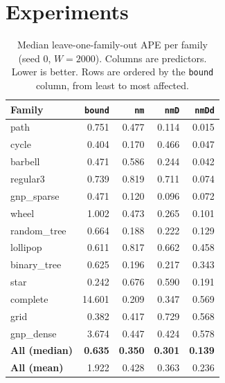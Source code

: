 \documentclass{article}
\begin{document}
\section{Experiments}
\begin{table}[t]
\caption{Median leave-one-family-out APE per family (seed 0, $W=2000$). Columns are predictors. Lower is better. Rows are ordered by the \texttt{bound} column, from least to most affected.}
\label{tab:fam}
\begin{center}
\small
\begin{tabular}{lrrrr}
\toprule
Family & \texttt{bound} & \texttt{nm} & \texttt{nmD} & \texttt{nmDd} \\
\midrule
path & 0.751 & 0.477 & 0.114 & 0.015 \\
cycle & 0.404 & 0.170 & 0.466 & 0.047 \\
barbell & 0.471 & 0.586 & 0.244 & 0.042 \\
regular3 & 0.739 & 0.819 & 0.711 & 0.074 \\
gnp\_sparse & 0.471 & 0.120 & 0.096 & 0.072 \\
wheel & 1.002 & 0.473 & 0.265 & 0.101 \\
random\_tree & 0.664 & 0.188 & 0.222 & 0.129 \\
lollipop & 0.611 & 0.817 & 0.662 & 0.458 \\
binary\_tree & 0.625 & 0.196 & 0.217 & 0.343 \\
star & 0.242 & 0.676 & 0.590 & 0.191 \\
complete & 14.601 & 0.209 & 0.347 & 0.569 \\
grid & 0.382 & 0.417 & 0.729 & 0.568 \\
gnp\_dense & 3.674 & 0.447 & 0.424 & 0.578 \\
\midrule
\textbf{All (median)} & \textbf{0.635} & \textbf{0.350} & \textbf{0.301} & \textbf{0.139} \\
\textbf{All (mean)} & 1.922 & 0.428 & 0.363 & 0.236 \\
\bottomrule
\end{tabular}
\end{center}
\vskip -0.1in
\end{table}
\end{document}
